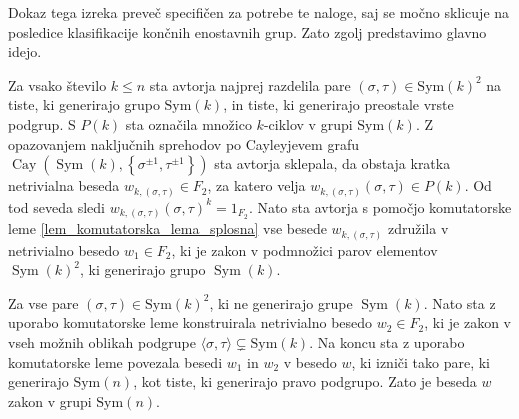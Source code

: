 Dokaz tega izreka preveč specifičen za potrebe te naloge, saj se močno sklicuje na posledice klasifikacije končnih enostavnih grup. Zato zgolj predstavimo glavno idejo. 

Za vsako število $k \le n$ sta avtorja najprej razdelila pare $(\sigma, \tau) \in \text{Sym}(k)^2$ na tiste,
ki generirajo grupo $\text{Sym}(k)$, in tiste, ki generirajo preostale vrste podgrup. S $P(k)$ sta označila množico $k$-ciklov v grupi $\text{Sym}(k)$. Z opazovanjem naključnih sprehodov po Cayleyjevem grafu $\operatorname{Cay}(\operatorname{Sym}(k), \left\{ \sigma^{\pm 1}, \tau^{\pm 1} \right\} )$ sta avtorja sklepala, da obstaja kratka netrivialna beseda $w_{k, (\sigma, \tau)} \in F_2$, za katero velja
$w_{k, (\sigma, \tau)}(\sigma, \tau) \in P(k)$. Od tod seveda sledi $w_{k, (\sigma, \tau)}(\sigma, \tau)^k = 1_{F_2}$. Nato sta avtorja s pomočjo komutatorske leme \ref{lem_komutatorska_lema_splosna} vse besede $w_{k, (\sigma, \tau)}$ združila v netrivialno besedo $w_1 \in F_2$, ki je zakon v podmnožici parov elementov $\operatorname{Sym}(k)^2$,
ki generirajo grupo $\operatorname{Sym}(k)$.

Za vse pare $(\sigma, \tau) \in \text{Sym}(k)^2$, ki ne generirajo grupe $\operatorname{Sym}(k)$. Nato sta z uporabo komutatorske leme konstruirala netrivialno besedo $w_2 \in F_2$, ki je zakon v vseh možnih oblikah podgrupe $\langle \sigma, \tau \rangle \subsetneq \text{Sym}(k)$.
Na koncu sta z uporabo komutatorske leme povezala besedi $w_1$ in $w_2$ v besedo $w$, ki izniči tako pare, ki generirajo $\text{Sym}(n)$, kot tiste, ki generirajo pravo podgrupo. Zato je beseda $w$ zakon v grupi $\text{Sym}(n)$.  

